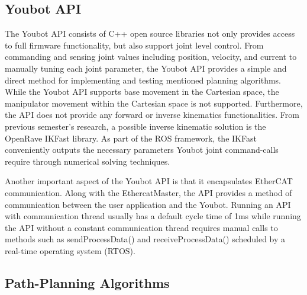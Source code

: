 \documentclass[titlepage]{article}
\begin{document}
\subsection{Youbot API}
The Youbot API consists of C++ open source libraries not only provides access to full firmware functionality, but also support joint level control. From commanding and sensing joint values including position, velocity, and current to manually tuning each joint parameter, the Youbot API provides a simple and direct method for implementing and testing mentioned planning algorithms. While the Youbot API supports base movement in the Cartesian space, the manipulator movement within the Cartesian space is not supported. Furthermore, the API does not provide any forward or inverse kinematics functionalities. From previous semester’s research, a possible inverse kinematic solution is the OpenRave IKFast library.   As part of the ROS framework, the IKFast conveniently outputs the necessary parameters Youbot joint command-calls require through numerical solving techniques.

Another important aspect of the Youbot API is that it encapsulates EtherCAT communication. Along with the EthercatMaster, the API provides a method of communication between the user application and the Youbot. Running an API with communication thread usually has a default cycle time of 1ms while running the API without a constant communication thread requires manual calls to methods such as sendProcessData() and receiveProcessData() scheduled by a real-time operating system (RTOS).
\subsection{Path-Planning Algorithms}
\end{document}
